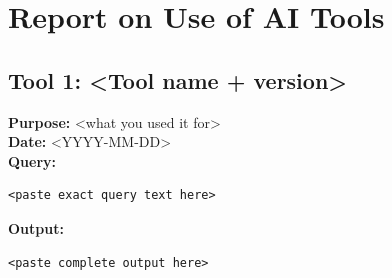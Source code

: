 %
%
\section*{Report on Use of AI Tools}

\subsection*{Tool 1: <Tool name + version>}
\textbf{Purpose:} <what you used it for> \\
\textbf{Date:} <YYYY-MM-DD> \\
\textbf{Query:}
\begin{verbatim}
<paste exact query text here>
\end{verbatim}
\textbf{Output:}
\begin{verbatim}
<paste complete output here>
\end{verbatim}


